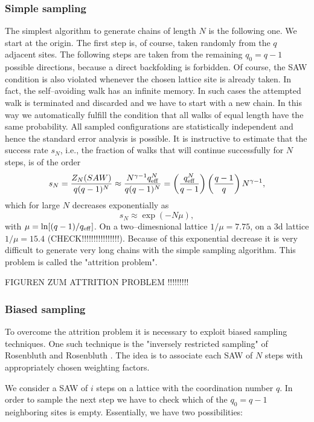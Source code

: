 \subsubsection{Simple sampling}
The simplest algorithm to generate chains of  length $N$ is the 
following one. We start at the origin. The first step is, of 
course,  taken randomly from the $q$ adjacent sites. The following 
steps are taken from the remaining $q_0=q-1$ possible directions, 
because a direct backfolding is forbidden. Of course, the SAW 
condition is also violated whenever the chosen lattice site is 
already taken. In fact, the self--avoiding walk has an infinite
memory. In such cases the attempted walk is terminated and 
discarded and we have to start with a new chain. In this way we 
automatically fulfill the condition that all walks  of equal 
length have the same probability. All sampled configurations are 
statistically independent and hence the standard error analysis 
is possible. It is instructive to estimate that the success rate
$s_N$, i.e., the fraction of walks that will continue successfully 
for $N$ steps, is of the order
\begin{equation*}
s_N = \frac{Z_N(SAW)}{q(q-1)^N} \approx
      \frac{N^{\gamma -1} q_{\rm eff}^N}{q(q-1)^N}
       = \left( \frac{q_{\rm eff}^N}{q-1}\right) 
         \left( \frac{q-1}{q} \right) N^{\gamma -1},
\end{equation*}
which for large $N$ decreases exponentially as
\begin{equation*}
s_N \approx \exp(-N \mu),
\end{equation*}
with $\mu=\ln[(q-1)/q_{\rm eff}]$. 
On a two--dimesnional lattice $1/\mu = 7.75$, on a 3d lattice
$1/\mu = 15.4$ (CHECK!!!!!!!!!!!!!!!!). Because of this exponential 
decrease it is very  difficult to generate very long chains with 
the simple sampling algorithm. This problem is called the 
"attrition problem".

FIGUREN ZUM ATTRITION PROBLEM !!!!!!!!!

\subsubsection{Biased sampling}
To overcome the attrition problem it is necessary to exploit 
biased sampling techniques. One such technique is the "inversely
restricted sampling" of Rosenbluth and Rosenbluth \cite{ROSENBLUTH}. 
The idea is to
associate each SAW of $N$ steps with appropriately chosen weighting 
factors. 

We consider a SAW of $i$ steps on a lattice with the coordination 
number $q$. In order to sample the next step we have to check  
which of the $q_0 = q-1$ neighboring sites is empty. Essentially,
we have two possibilities:

